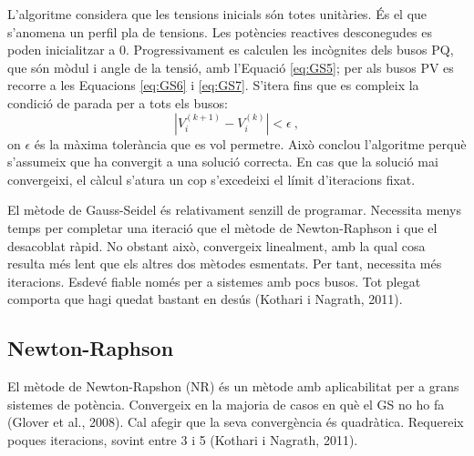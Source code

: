 L'algoritme considera que les tensions inicials són totes unitàries. És el que s'anomena un perfil pla de tensions. Les potències reactives desconegudes es poden inicialitzar a 0. Progressivament es calculen les incògnites dels busos PQ, que són mòdul i angle de la tensió, amb l'Equació \ref{eq:GS5}; per als busos PV es recorre a les Equacions \ref{eq:GS6} i \ref{eq:GS7}. S'itera fins que es compleix la condició de parada per a tots els busos:
\begin{equation}
    |V^{(k+1)}_i-V^{(k)}_i|<\epsilon\ ,
    \label{eq:GS8}
\end{equation}
on $\epsilon$ és la màxima tolerància que es vol permetre. Això conclou l'algoritme perquè s'assumeix que ha convergit a una solució correcta. En cas que la solució mai convergeixi, el càlcul s'atura un cop s'excedeixi el límit d'iteracions fixat.

El mètode de Gauss-Seidel és relativament senzill de programar. Necessita menys temps per completar una iteració que el mètode de Newton-Raphson i que el desacoblat ràpid. No obstant això, convergeix linealment, amb la qual cosa resulta més lent que els altres dos mètodes esmentats. Per tant, necessita més iteracions. Esdevé fiable només per a sistemes amb pocs busos. Tot plegat comporta que hagi quedat bastant en desús (Kothari i Nagrath, 2011). 

\subsection{Newton-Raphson} %
El mètode de Newton-Rapshon (NR) és un mètode amb aplicabilitat per a grans sistemes de potència. Convergeix en la majoria de casos en què el GS no ho fa (Glover et al., 2008). Cal afegir que la seva convergència és quadràtica. Requereix poques iteracions, sovint entre 3 i 5 (Kothari i Nagrath, 2011). 


